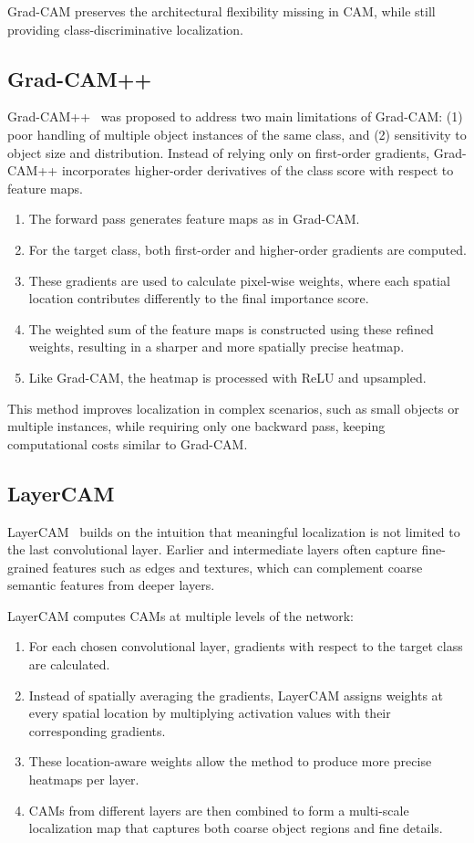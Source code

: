 Grad-CAM preserves the architectural flexibility missing in CAM, while still providing class-discriminative localization.

\subsection{Grad-CAM++}
Grad-CAM++~\cite{cam_gradpp} was proposed to address two main limitations of Grad-CAM: (1) poor handling of multiple object instances of the same class, and (2) sensitivity to object size and distribution. Instead of relying only on first-order gradients, Grad-CAM++ incorporates higher-order derivatives of the class score with respect to feature maps.

\begin{enumerate}
    \item The forward pass generates feature maps as in Grad-CAM.
    \item For the target class, both first-order and higher-order gradients are computed.
    \item These gradients are used to calculate pixel-wise weights, where each spatial location contributes differently to the final importance score.
    \item The weighted sum of the feature maps is constructed using these refined weights, resulting in a sharper and more spatially precise heatmap.
    \item Like Grad-CAM, the heatmap is processed with ReLU and upsampled.
\end{enumerate}

This method improves localization in complex scenarios, such as small objects or multiple instances, while requiring only one backward pass, keeping computational costs similar to Grad-CAM.

\subsection{LayerCAM}
LayerCAM~\cite{layer_cam} builds on the intuition that meaningful localization is not limited to the last convolutional layer. Earlier and intermediate layers often capture fine-grained features such as edges and textures, which can complement coarse semantic features from deeper layers.

LayerCAM computes CAMs at multiple levels of the network:
\begin{enumerate}
    \item For each chosen convolutional layer, gradients with respect to the target class are calculated.
    \item Instead of spatially averaging the gradients, LayerCAM assigns weights at every spatial location by multiplying activation values with their corresponding gradients.
    \item These location-aware weights allow the method to produce more precise heatmaps per layer.
    \item CAMs from different layers are then combined to form a multi-scale localization map that captures both coarse object regions and fine details.
\end{enumerate}

